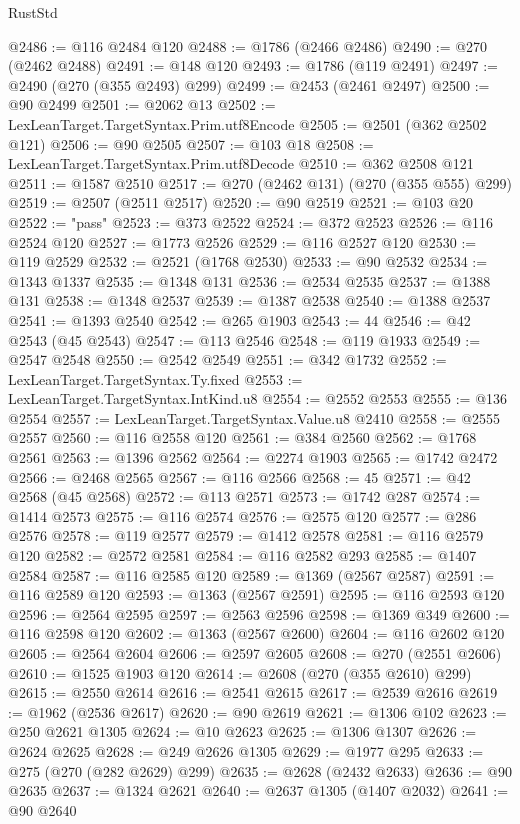 \begin{lexlean}{RustStd}
\begin{coremodule}
@2486 := @116 @2484 @120
@2488 := @1786 (@2466 @2486)
@2490 := @270 (@2462 @2488)
@2491 := @148 @120
@2493 := @1786 (@119 @2491)
@2497 := @2490 (@270 (@355 @2493) @299)
@2499 := @2453 (@2461 @2497)
@2500 := @90 @2499
@2501 := @2062 @13
@2502 := LexLeanTarget.TargetSyntax.Prim.utf8Encode
@2505 := @2501 (@362 @2502 @121)
@2506 := @90 @2505
@2507 := @103 @18
@2508 := LexLeanTarget.TargetSyntax.Prim.utf8Decode
@2510 := @362 @2508 @121
@2511 := @1587 @2510
@2517 := @270 (@2462 @131) (@270 (@355 @555) @299)
@2519 := @2507 (@2511 @2517)
@2520 := @90 @2519
@2521 := @103 @20
@2522 := "pass"
@2523 := @373 @2522
@2524 := @372 @2523
@2526 := @116 @2524 @120
@2527 := @1773 @2526
@2529 := @116 @2527 @120
@2530 := @119 @2529
@2532 := @2521 (@1768 @2530)
@2533 := @90 @2532
@2534 := @1343 @1337
@2535 := @1348 @131
@2536 := @2534 @2535
@2537 := @1388 @131
@2538 := @1348 @2537
@2539 := @1387 @2538
@2540 := @1388 @2537
@2541 := @1393 @2540
@2542 := @265 @1903
@2543 := 44
@2546 := @42 @2543 (@45 @2543)
@2547 := @113 @2546
@2548 := @119 @1933
@2549 := @2547 @2548
@2550 := @2542 @2549
@2551 := @342 @1732
@2552 := LexLeanTarget.TargetSyntax.Ty.fixed
@2553 := LexLeanTarget.TargetSyntax.IntKind.u8
@2554 := @2552 @2553
@2555 := @136 @2554
@2557 := LexLeanTarget.TargetSyntax.Value.u8 @2410
@2558 := @2555 @2557
@2560 := @116 @2558 @120
@2561 := @384 @2560
@2562 := @1768 @2561
@2563 := @1396 @2562
@2564 := @2274 @1903
@2565 := @1742 @2472
@2566 := @2468 @2565
@2567 := @116 @2566
@2568 := 45
@2571 := @42 @2568 (@45 @2568)
@2572 := @113 @2571
@2573 := @1742 @287
@2574 := @1414 @2573
@2575 := @116 @2574
@2576 := @2575 @120
@2577 := @286 @2576
@2578 := @119 @2577
@2579 := @1412 @2578
@2581 := @116 @2579 @120
@2582 := @2572 @2581
@2584 := @116 @2582 @293
@2585 := @1407 @2584
@2587 := @116 @2585 @120
@2589 := @1369 (@2567 @2587)
@2591 := @116 @2589 @120
@2593 := @1363 (@2567 @2591)
@2595 := @116 @2593 @120
@2596 := @2564 @2595
@2597 := @2563 @2596
@2598 := @1369 @349
@2600 := @116 @2598 @120
@2602 := @1363 (@2567 @2600)
@2604 := @116 @2602 @120
@2605 := @2564 @2604
@2606 := @2597 @2605
@2608 := @270 (@2551 @2606)
@2610 := @1525 @1903 @120
@2614 := @2608 (@270 (@355 @2610) @299)
@2615 := @2550 @2614
@2616 := @2541 @2615
@2617 := @2539 @2616
@2619 := @1962 (@2536 @2617)
@2620 := @90 @2619
@2621 := @1306 @102
@2623 := @250 @2621 @1305
@2624 := @10 @2623
@2625 := @1306 @1307
@2626 := @2624 @2625
@2628 := @249 @2626 @1305
@2629 := @1977 @295
@2633 := @275 (@270 (@282 @2629) @299)
@2635 := @2628 (@2432 @2633)
@2636 := @90 @2635
@2637 := @1324 @2621
@2640 := @2637 @1305 (@1407 @2032)
@2641 := @90 @2640

\end{coremodule}
\end{lexlean}
